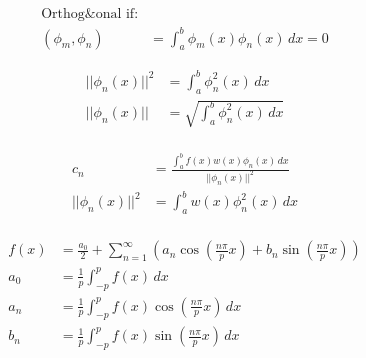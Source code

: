\documentclass[12pt]{article}
\begin{document}
\begin{multicols}{2}

  \begin{equation*}
    \begin{split}
      \text{Orthog&onal if:}\\
      (\phi_m,\phi_n)&=\int_a^b \phi_m(x)\phi_n(x)\,dx=0
    \end{split}
    \label{9}
  \end{equation*}

  \begin{equation*}
    \begin{split}
      ||\phi_n(x)||^2&=\int_a^b \phi_n^2(x)\,dx\\
      ||\phi_n(x)||&=\sqrt{\int_a^b \phi_n^2(x)\,dx}\\
    \end{split}
    \label{10}
  \end{equation*}

\end{multicols}

\begin{multicols}{2}

  \begin{equation*}
    \begin{split}
      c_n&=\frac{\int_a^b f(x)w(x)\phi_n(x)\,dx}{||\phi_n(x)||^2}\\
        ||\phi_n(x)||^2&=\int_a^b w(x)\phi_n^2(x)\,dx\\
    \end{split}
    \label{11}
  \end{equation*}

  \begin{equation*}
    \begin{split}
      f(x)&=\frac{a_0}{2}+\sum_{n=1}^{\infty}\left( a_n\cos\left( \frac{n\pi}{p}x \right)+b_n\sin\left( \frac{n\pi}{p}x \right) \right)\\
      a_0&=\frac{1}{p}\int_{-p}^pf(x)\,dx\\
      a_n&=\frac{1}{p}\int_{-p}^pf(x)\cos\left( \frac{n\pi}{p}x \right)\,dx\\
      b_n&=\frac{1}{p}\int_{-p}^pf(x)\sin\left( \frac{n\pi}{p}x \right)\,dx\\
    \end{split}
    \label{12}
  \end{equation*}

\end{multicols}
\end{document}

